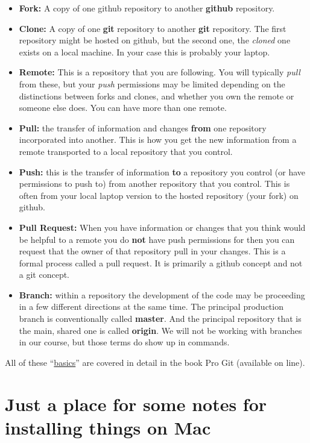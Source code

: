 \documentclass[
  letterpaper,
  DIV=11,
  numbers=noendperiod]{scrreprt}
\providecommand{\tightlist}{%
  \setlength{\itemsep}{0pt}\setlength{\parskip}{0pt}}\usepackage{longtable,booktabs,array}
\begin{document}
\begin{itemize}
\tightlist
\item
  \textbf{Fork:} A copy of one github repository to another
  \textbf{github} repository.
\item
  \textbf{Clone:} A copy of one \textbf{git} repository to another
  \textbf{git} repository. The first repository might be hosted on
  github, but the second one, the \emph{cloned} one exists on a local
  machine. In your case this is probably your laptop.
\item
  \textbf{Remote:} This is a repository that you are following. You will
  typically \emph{pull} from these, but your \emph{push} permissions may
  be limited depending on the distinctions between forks and clones, and
  whether you own the remote or someone else does. You can have more
  than one remote.
\item
  \textbf{Pull:} the transfer of information and changes \textbf{from}
  one repository incorporated into another. This is how you get the new
  information from a remote transported to a local repository that you
  control.
\item
  \textbf{Push:} this is the transfer of information \textbf{to} a
  repository you control (or have permissions to push to) from another
  repository that you control. This is often from your local laptop
  version to the hosted repository (your fork) on github.
\item
  \textbf{Pull Request:} When you have information or changes that you
  think would be helpful to a remote you do \textbf{not} have push
  permissions for then you can request that the owner of that repository
  pull in your changes. This is a formal process called a pull request.
  It is primarily a github concept and not a git concept.
\item
  \textbf{Branch:} within a repository the development of the code may
  be proceeding in a few different directions at the same time. The
  principal production branch is conventionally called \textbf{master}.
  And the principal repository that is the main, shared one is called
  \textbf{origin}. We will not be working with branches in our course,
  but those terms do show up in commands.
\end{itemize}

All of these
``\href{https://git-scm.com/book/en/v2/Git-Basics-Getting-a-Git-Repository}{basics}''
are covered in detail in the book Pro Git (available on line).

\chapter{Just a place for some notes for installing things on
Mac}\label{just-a-place-for-some-notes-for-installing-things-on-mac}
\end{document}
